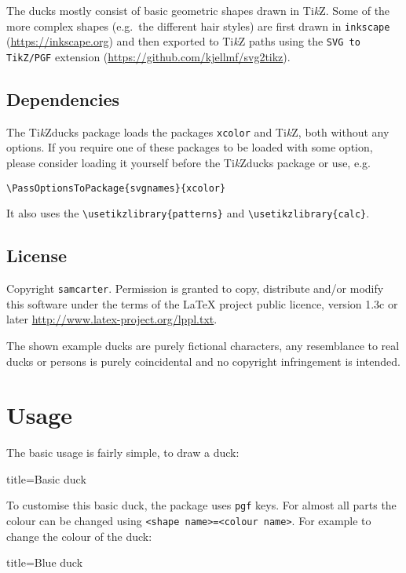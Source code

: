 \documentclass[parskip=half]{scrartcl}
\newcommand{\TikZ}{Ti\emph{k}Z\xspace}
\newcommand{\tikzducks}{Ti\emph{k}Zducks\xspace}
\begin{document}
The ducks mostly consist of basic geometric shapes drawn in \TikZ. Some of the more complex shapes (e.g.\ the different hair styles) are first drawn in \texttt{inkscape} (\url{https://inkscape.org}) and then exported to \TikZ paths using the \texttt{SVG to TikZ/PGF} extension (\url{https://github.com/kjellmf/svg2tikz}).

\subsection{Dependencies}

The \tikzducks package loads the packages \lstinline|xcolor| and \TikZ, both without any options. If you require one of these packages to be loaded with some option, please consider loading it yourself before the \tikzducks package or use, e.g.

\begin{lstlisting}[morekeywords={xcolor,svgnames}]
	\PassOptionsToPackage{svgnames}{xcolor}
\end{lstlisting}
It also uses the \lstinline|\usetikzlibrary{patterns}| and \lstinline|\usetikzlibrary{calc}|.

\subsection{License}

Copyright 
\texttt{samcarter}. Permission is granted to copy, distribute and\slash or modify this software under the terms of the LaTeX project public licence, version 1.3c or later \url{http://www.latex-project.org/lppl.txt}.

The shown example ducks are purely fictional characters, any resemblance to real ducks or persons is purely coincidental and no copyright infringement is intended.

\section{Usage}

The basic usage is fairly simple, to draw a duck:
\begin{tcblisting}{title={Basic duck}}
\begin{tikzpicture}
	\duck
\end{tikzpicture}
\end{tcblisting}

To customise this basic duck, the package uses \lstinline|pgf| keys. For almost all parts the colour can be changed using \lstinline|<shape name>=<colour name>|. For example to change the colour of the duck:
\begin{tcblisting}{title={Blue duck}}
\begin{tikzpicture}
	\duck[body=blue]
\end{tikzpicture}
\end{tcblisting}
\end{document}
